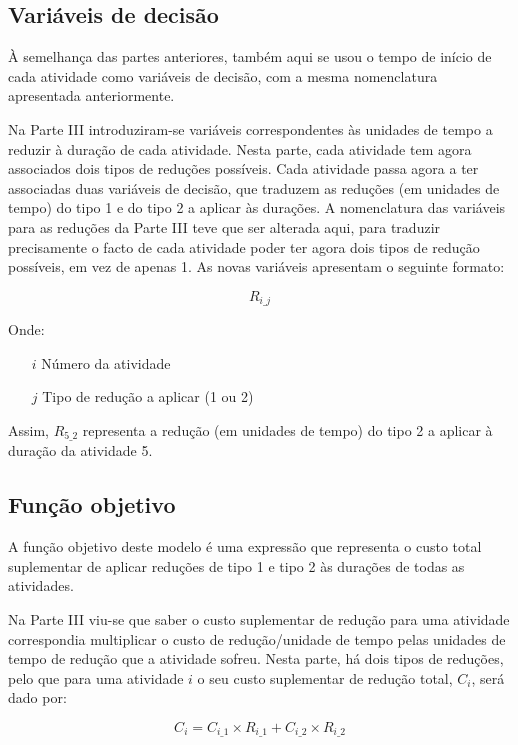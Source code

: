 \subsection{Variáveis de decisão}
\label{p5:subsec:vardec}

À semelhança das partes anteriores, também aqui se usou o tempo de início de cada atividade como variáveis de decisão, com a mesma nomenclatura apresentada anteriormente. 

Na Parte III introduziram-se variáveis correspondentes às unidades de tempo a reduzir à duração de cada atividade. Nesta parte, cada atividade tem agora associados dois tipos de reduções possíveis. Cada atividade passa agora a ter associadas duas variáveis de decisão, que traduzem as reduções (em unidades de tempo) do tipo 1 e do tipo 2 a aplicar às durações. A nomenclatura das variáveis para as reduções da Parte III teve que ser alterada aqui, para traduzir precisamente o facto de cada atividade poder ter agora dois tipos de redução possíveis, em vez de apenas 1. As novas variáveis apresentam o seguinte formato:

\begin{displaymath}
R_{i\_j}
\end{displaymath}

Onde:
\begin{itemize}
	\item[$i$] Número da atividade
	\item[$j$] Tipo de redução a aplicar (1 ou 2)
\end{itemize}

Assim, $R_{5\_2}$ representa a redução (em unidades de tempo) do tipo 2 a aplicar à duração da atividade 5.


\subsection{Função objetivo}

A função objetivo deste modelo é uma expressão que representa o custo total suplementar de aplicar reduções de tipo 1 e tipo 2 às durações de todas as atividades.

Na Parte III viu-se que saber o custo suplementar de redução para uma atividade correspondia multiplicar o custo de redução/unidade de tempo pelas unidades de tempo de redução que a atividade sofreu. Nesta parte, há dois tipos de reduções, pelo que para uma atividade $i$ o seu custo suplementar de redução total, $C_{i}$, será dado por:

\begin{displaymath}
C_{i} = C_{i\_1} \times R_{i\_1} + C_{i\_2} \times R_{i\_2}
\end{displaymath}

